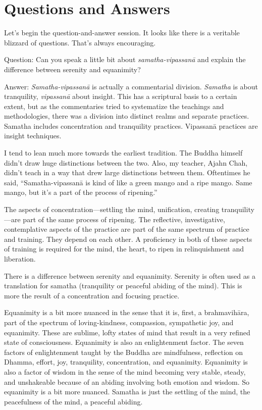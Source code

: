 \chapter{Questions and Answers}

Let’s begin the question-and-answer session. It looks like there is a
veritable blizzard of questions. That’s always encouraging.

\qaspace
Question: Can you speak a little bit about \emph{samatha-vipassanā} and
explain the difference between serenity and equanimity?

\qaspace
Answer: \emph{Samatha-vipassanā} is actually a commentarial division.
\emph{Samatha} is about tranquility, \emph{vipassanā} about insight.
This has a scriptural basis to a certain extent, but as the commentaries
tried to systematize the teachings and methodologies, there was a
division into distinct realms and separate practices. Samatha includes
concentration and tranquility practices. Vipassanā practices are insight
techniques.

I tend to lean much more towards the earliest tradition. The Buddha
himself didn’t draw huge distinctions between the two. Also, my teacher,
Ajahn Chah, didn’t teach in a way that drew large distinctions between
them. Oftentimes he said, “Samatha-vipassanā is kind of like a green
mango and a ripe mango. Same mango, but it’s a part of the process of
ripening.”

The aspects of concentration—settling the mind, unification, creating
tranquility—are part of the same process of ripening. The reflective,
investigative, contemplative aspects of the practice are part of the
same spectrum of practice and training. They depend on each other. A
proficiency in both of these aspects of training is required for the
mind, the heart, to ripen in relinquishment and liberation.

There is a difference between serenity and equanimity. Serenity is often
used as a translation for samatha (tranquility or peaceful abiding of
the mind). This is more the result of a concentration and focusing
practice.

Equanimity is a bit more nuanced in the sense that it is, first, a
brahmavihāra, part of the spectrum of loving-kindness, compassion,
sympathetic joy, and equanimity. These are sublime, lofty states of mind
that result in a very refined state of consciousness. Equanimity is also
an enlightenment factor. The seven factors of enlightenment taught by
the Buddha are mindfulness, reflection on Dhamma, effort, joy,
tranquility, concentration, and equanimity. Equanimity is also a factor
of wisdom in the sense of the mind becoming very stable, steady, and
unshakeable because of an abiding involving both emotion and wisdom. So
equanimity is a bit more nuanced. Samatha is just the settling of the
mind, the peacefulness of the mind, a peaceful abiding.

